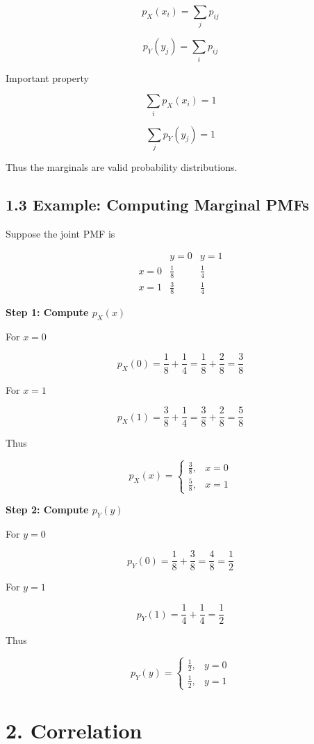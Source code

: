 \documentclass[12pt]{article}
\begin{document}
\[
p_X(x_i)=\sum_j p_{ij}
\]

\[
p_Y(y_j)=\sum_i p_{ij}
\]

Important property

\[
\sum_i p_X(x_i)=1
\]

\[
\sum_j p_Y(y_j)=1
\]

Thus the marginals are valid probability distributions.

\subsection*{1.3 Example: Computing Marginal PMFs}

Suppose the joint PMF is

\[
\begin{array}{c|cc}
 & y=0 & y=1 \\
\hline
x=0 & \frac{1}{8} & \frac{1}{4} \\
x=1 & \frac{3}{8} & \frac{1}{4}
\end{array}
\]

\textbf{Step 1: Compute $p_X(x)$}

For $x=0$

\[
p_X(0)=\frac{1}{8}+\frac{1}{4}=\frac{1}{8}+\frac{2}{8}=\frac{3}{8}
\]

For $x=1$

\[
p_X(1)=\frac{3}{8}+\frac{1}{4}=\frac{3}{8}+\frac{2}{8}=\frac{5}{8}
\]

Thus

\[
p_X(x)=
\begin{cases}
\frac{3}{8}, & x=0 \\
\frac{5}{8}, & x=1
\end{cases}
\]

\textbf{Step 2: Compute $p_Y(y)$}

For $y=0$

\[
p_Y(0)=\frac{1}{8}+\frac{3}{8}=\frac{4}{8}=\frac{1}{2}
\]

For $y=1$

\[
p_Y(1)=\frac{1}{4}+\frac{1}{4}=\frac{1}{2}
\]

Thus

\[
p_Y(y)=
\begin{cases}
\frac{1}{2}, & y=0 \\
\frac{1}{2}, & y=1
\end{cases}
\]

\section*{2. Correlation}
\end{document}
